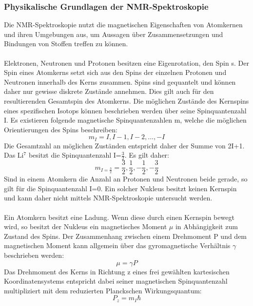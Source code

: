 \documentclass[a4paper, 11pt, headsepline,footsepline,twoside,abstract]{scrbook}
\begin{document}
\subsubsection{Physikalische Grundlagen der NMR-Spektroskopie}
Die NMR-Spektroskopie nutzt die magnetischen Eigenschaften von Atomkernen und ihren Umgebungen aus, um Aussagen über Zusammensetzungen und Bindungen von Stoffen treffen zu können.
\\\\
Elektronen, Neutronen und Protonen besitzen eine Eigenrotation, den Spin s. Der Spin eines Atomkerns setzt sich aus den Spins der einzelnen Protonen und Neutronen innerhalb des Kerns zusammen. Spins sind gequantelt und können daher nur gewisse diskrete Zustände annehmen. Dies gilt auch für den resultierenden Gesamtspin des Atomkerns. Die möglichen Zustände des Kernspins eines spezifischen Isotops können beschrieben werden über seine Spinquantenzahl I. Es existieren folgende magnetische Spinquantenzahlen m, welche die möglichen Orientierungen des Spins beschreiben:
\begin{equation}
m_I = I, I-1, I-2, ..., -I
\end{equation}
Die Gesamtzahl an möglichen Zuständen entspricht daher der Summe von 2I+1. Das Li$^7$ besitzt die Spinquantenzahl I=$\frac{3}{2}$. Es gilt daher:
\begin{equation}
m_{I=\frac{3}{2}} = \frac{3}{2}, \frac{1}{2}, -\frac{1}{2}, -\frac{3}{2}
\end{equation}
Sind in einem Atomkern die Anzahl an Protonen und Neutronen beide gerade, so gilt für die Spinquantenzahl I=0. Ein solcher Nukleus besitzt keinen Kernspin und kann daher nicht mittels NMR-Spektroskopie untersucht werden.
\\\\
Ein Atomkern besitzt eine Ladung. Wenn diese durch einen Kernspin bewegt wird, so besitzt der Nukleus ein magnetisches Moment $\mu$ in Abhängigkeit zum Zustand des Spins. Der Zusammenhang zwischen einem Drehmoment P und dem magnetischen Moment kann allgemein über das gyromagnetische Verhältnis $\gamma$ beschrieben werden: 
\begin{equation}
\mu = \gamma P
\end{equation}
Das Drehmoment des Kerns in Richtung z eines frei gewählten kartesischen Koordinatensystems entspricht dabei seiner magnetischen Spinquantenzahl multipliziert mit dem reduzierten Planckschen Wirkungsquantum:
\begin{equation}
P_z = m_I \hbar
\end{equation}
\end{document}
